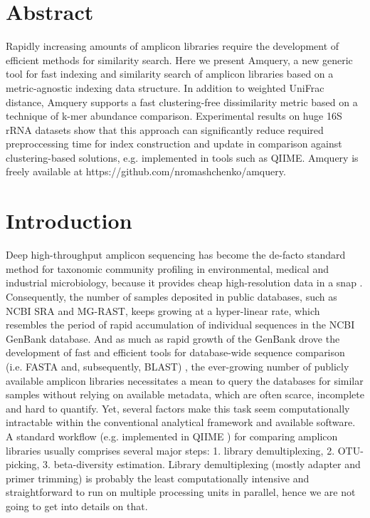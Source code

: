 \documentclass[10pt,letterpaper]{article}
\begin{document}
\section*{Abstract}
Rapidly increasing amounts of amplicon libraries require the development of efficient methods for similarity search. 
Here we present Amquery, a new generic tool for fast indexing and similarity search of amplicon libraries based on a metric-agnostic indexing data structure. 
In addition to weighted UniFrac distance, Amquery supports a fast clustering-free dissimilarity metric based on a technique of k-mer abundance comparison.
Experimental results on huge 16S rRNA datasets show that this approach can significantly reduce required preproccessing time for index construction and update in comparison against clustering-based solutions, e.g. implemented in tools such as QIIME.
Amquery is freely available at https://github.com/nromashchenko/amquery.

\linenumbers

\section*{Introduction}
Deep high-throughput amplicon sequencing has become the de-facto standard method for taxonomic community profiling in environmental, medical and industrial microbiology, because it provides cheap high-resolution data in a snap \cite{Knight2012}. 
Consequently, the number of samples deposited in public databases, such as NCBI SRA and MG-RAST, keeps growing at a hyper-linear rate, which resembles the period of rapid accumulation of individual sequences in the NCBI GenBank database. 
And as much as rapid growth of the GenBank drove the development of fast and efficient tools for database-wide sequence comparison (i.e. FASTA and, subsequently, BLAST) \cite{Madden1996}, the ever-growing number of publicly available amplicon libraries necessitates a mean to query the databases for similar samples without relying on available metadata, which are often scarce, incomplete and hard to quantify. 
Yet, several factors make this task seem computationally intractable within the conventional analytical framework and available software. A standard workflow (e.g. implemented in QIIME \cite{caporaso2010qiime}) for comparing amplicon libraries usually comprises several major steps: 1. library demultiplexing, 2. OTU-picking, 3. beta-diversity estimation. 
Library demultiplexing (mostly adapter and primer trimming) is probably the least computationally intensive and straightforward to run on multiple processing units in parallel, hence we are not going to get into details on that. 
\end{document}
